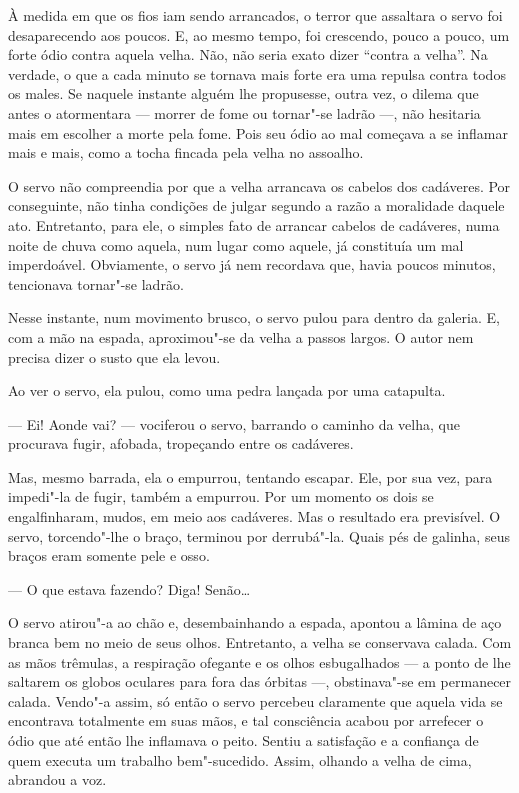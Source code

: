 À medida em que os fios iam sendo arrancados, o terror que assaltara o
servo foi desaparecendo aos poucos. E, ao mesmo tempo, foi crescendo,
pouco a pouco, um forte ódio contra aquela velha. Não, não seria exato
dizer ``contra a velha''. Na verdade, o que a cada minuto se tornava mais
forte era uma repulsa contra todos os males. Se naquele instante alguém
lhe propusesse, outra vez, o dilema que antes o atormentara --- morrer de
fome ou tornar"-se ladrão ---, não hesitaria mais em escolher a morte pela
fome. Pois seu ódio ao mal começava a se inflamar mais e mais, como a
tocha fincada pela velha no assoalho.

O servo não compreendia por que a velha arrancava os cabelos dos
cadáveres. Por conseguinte, não tinha condições de julgar segundo a
razão a moralidade daquele ato. Entretanto, para ele, o simples fato de
arrancar cabelos de cadáveres, numa noite de chuva como aquela, num
lugar como aquele, já constituía um mal imperdoável. Obviamente, o
servo já nem recordava que, havia poucos minutos, tencionava tornar"-se
ladrão.

Nesse instante, num movimento brusco, o servo pulou para dentro da
galeria. E, com a mão na espada, aproximou"-se da velha a passos largos.
O autor nem precisa dizer o susto que ela levou.

Ao ver o servo, ela pulou, como uma pedra lançada por uma catapulta.

--- Ei! Aonde vai? --- vociferou o servo, barrando o caminho da velha, que
procurava fugir, afobada, tropeçando entre os cadáveres.

Mas, mesmo barrada, ela o empurrou, tentando escapar. Ele, por sua vez,
para impedi"-la de fugir, também a empurrou. Por um momento os dois se
engalfinharam, mudos, em meio aos cadáveres. Mas o resultado era
previsível. O servo, torcendo"-lhe o braço, terminou por derrubá"-la.
Quais pés de galinha, seus braços eram somente pele e osso.

--- O que estava fazendo? Diga! Senão\ldots{}

O servo atirou"-a ao chão e, desembainhando a espada, apontou a lâmina de
aço branca bem no meio de seus olhos. Entretanto, a velha se conservava
calada. Com as mãos trêmulas, a respiração ofegante e os olhos
esbugalhados --- a ponto de lhe saltarem os globos oculares para fora das
órbitas ---, obstinava"-se em permanecer calada. Vendo"-a assim, só então o
servo percebeu claramente que aquela vida se encontrava totalmente em
suas mãos, e tal consciência acabou por arrefecer o ódio que até então
lhe inflamava o peito. Sentiu a satisfação e a confiança de quem
executa um trabalho bem"-sucedido. Assim, olhando a velha de cima,
abrandou a voz.

